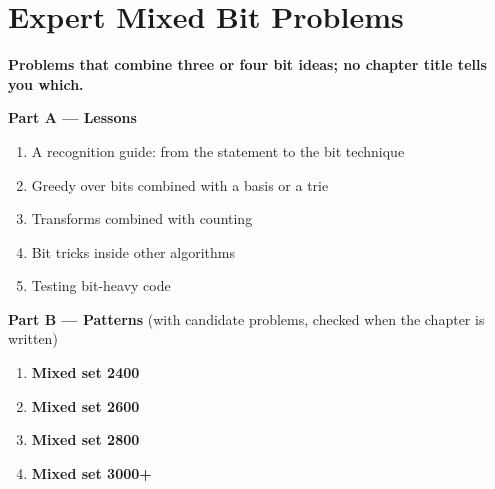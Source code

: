\chapter{Expert Mixed Bit Problems}
\label{ch:expert_mixed}

\begin{tcolorbox}[enhanced, colback=white, colframe=secondaryblue, boxrule=1pt, arc=2mm]
\textbf{\large\textcolor{primaryblue}{Problems that combine three or four bit ideas; no chapter title tells you which.}}
\end{tcolorbox}


\begin{plannedbox}
\textbf{Part A --- Lessons}
\begin{enumerate}[leftmargin=*, label=\textbf{A\arabic*.}, itemsep=1pt]
    \item A recognition guide: from the statement to the bit technique
    \item Greedy over bits combined with a basis or a trie
    \item Transforms combined with counting
    \item Bit tricks inside other algorithms
    \item Testing bit-heavy code
\end{enumerate}
\textbf{Part B --- Patterns} (with candidate problems, checked when the chapter is written)
\begin{enumerate}[leftmargin=*, label=\textbf{P\arabic*.}, itemsep=1pt]
    \item \textbf{Mixed set 2400}
    \item \textbf{Mixed set 2600}
    \item \textbf{Mixed set 2800}
    \item \textbf{Mixed set 3000+}
\end{enumerate}
\end{plannedbox}
